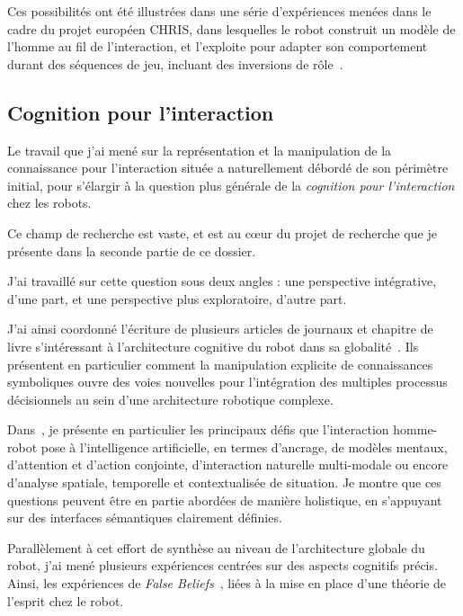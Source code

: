 \documentclass[a4paper]{article}
\begin{document}
Ces possibilités ont été illustrées dans une série d'expériences menées dans le
cadre du projet européen CHRIS, dans lesquelles le robot construit un modèle de
l'homme au fil de l'interaction, et l'exploite pour adapter son comportement durant
des séquences de jeu, incluant des inversions de rôle~\cite{Lallee2010b,
Lallee2011, Lallee2012}.



\subsection{Cognition pour l'interaction%
  \label{cognition-for-interaction}%
}

Le travail que j'ai mené sur la représentation et la manipulation de la
connaissance pour l'interaction située a naturellement débordé de son périmètre
initial, pour s'élargir à la question plus générale de la \emph{cognition pour
l'interaction} chez les robots.

Ce champ de recherche est vaste, et est au c\oe ur du projet de recherche que je
présente dans la seconde partie de ce dossier.

J'ai travaillé sur cette question sous deux angles : une perspective
intégrative, d'une part, et une perspective plus exploratoire, d'autre part.

J'ai ainsi coordonné l'écriture de plusieurs articles de journaux et chapitre de
livre s'intéressant à l'architecture cognitive du robot dans sa
globalité~\cite{alami2011when, Lemaignan2012, lemaignan2014human}. Ils
présentent en particulier comment la manipulation explicite de connaissances
symboliques ouvre des voies nouvelles pour l'intégration des multiples processus
décisionnels au sein d'une architecture robotique complexe.

Dans~\cite{lemaignan2014human}, je présente en particulier les
principaux défis que l'interaction homme-robot pose à l'intelligence
artificielle, en termes d'ancrage, de modèles mentaux, d'attention et
d'action conjointe, d'interaction naturelle multi-modale ou encore d'analyse
spatiale, temporelle et contextualisée de situation. Je montre que ces
questions peuvent être en partie abordées de manière holistique, en s'appuyant
sur des interfaces sémantiques clairement définies.

Parallèlement à cet effort de synthèse au niveau de l'architecture globale du
robot, j'ai mené plusieurs expériences centrées sur des aspects cognitifs
précis. Ainsi, les expériences de \emph{False Beliefs}~\cite{warnier2012when},
liées à la mise en place d'une théorie de l'esprit chez le robot.
\end{document}

